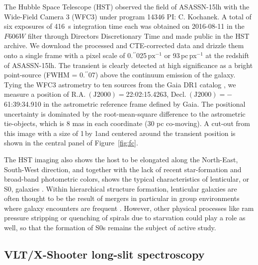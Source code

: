 \documentclass[traditabstract]{aa}
\newcommand{\farc}{\hbox{$.\!\!^{\prime\prime}$}}
\begin{document}
The Hubble Space Telescope (HST) observed the field of ASASSN-15lh with the Wide-Field Camera 3 (WFC3) under program 14346 PI: C. Kochanek. A total of six exposures of 416~s integration time each was obtained on 2016-08-11 in the $F606W$ filter through Directors Discretionary Time and made public in the HST archive. We download the processed and CTE-corrected data and drizzle them onto a single frame with a pixel scale of 0\farc{025}\,$\mathrm{px}^{-1}$ or 93\,pc\,px$^{-1}$ at the redshift of ASASSN-15lh. The transient is clearly detected at high significance as a bright point-source (FWHM = 0\farc{07}) above the continuum emission of the galaxy. Tying the WFC3 astrometry to ten sources from the Gaia DR1 catalog \citep{2016A&A...595A...2G, 2016A&A...595A...1G}, we measure a position of $\mathrm{R.A.~(J2000)}=$22:02:15.4263, $\mathrm{Decl.~(J2000)} = -$61:39:34.910 in the astrometric reference frame defined by Gaia. The positional uncertainty is dominated by the root-mean-square difference to the astrometric tie-objects, which is 8 mas in each coordinate (30 pc co-moving). A cut-out from this image with a size of 1\arcmin\,by 1\arcmin and centered around the transient position is shown in the central panel of Figure~\ref{fig:fc}.

The HST imaging also shows the host to be elongated along the North-East, South-West direction, and together with the lack of recent star-formation and broad-band photometric colors, shows the typical characteristics of lenticular, or S0, galaxies \citep[e.g.,][]{2009ARA&A..47..159B}. Within hierarchical structure formation, lenticular galaxies are often thought to be the result of mergers in particular in group environments where galaxy encounters are frequent \citep[e.g.,][]{2005A&A...437...69B, 2011MNRAS.415.1783B}. However, other physical processes like ram pressure stripping or quenching of spirals due to starvation could play a role as well, so that the formation of S0s remains the subject of active study.



\subsection{VLT/X-Shooter long-slit spectroscopy}
\label{obs:xs}
\end{document}
